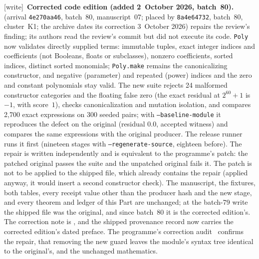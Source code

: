 \documentclass[11pt,letterpaper]{article}
\numberwithin{equation}{section}
\theoremstyle{definition}
\theoremstyle{remark}
\newcommand{\wtag}{\textup{[write]}}
\begin{document}
\wtag\ \textbf{Corrected code edition (added 2~October 2026, batch~80).}  (arrival \texttt{4e270aa46}, batch~80, manuscript~07; placed by \texttt{8a4e64732}, batch~80, cluster~K1; the archive dates its correction 3~October 2026) repairs the review's finding; its authors read the review's commit but did not execute its code. \texttt{Poly} now validates directly supplied terms: immutable tuples, exact integer indices and coefficients (not Booleans, floats or subclasses), nonzero coefficients, sorted indices, distinct sorted monomials; \texttt{Poly.make} remains the canonicalizing constructor, and negative (parameter) and repeated (power) indices and the zero and constant polynomials stay valid. The new suite  rejects 24 malformed constructor categories and the floating false zero (the exact residual at $2^{60}+1$ is $-1$, with score~$1$), checks canonicalization and mutation isolation, and compares 2{,}700 exact expressions on 300 seeded pairs; with \texttt{--baseline-module} it reproduces the defect on the original (residual $0.0$, accepted witness) and compares the same expressions with the original producer. The release runner runs it first (nineteen stages with \texttt{--regenerate-source}, eighteen before). The repair is written independently and is equivalent to the programme's patch: the patched original passes the suite and the unpatched original fails it. The patch is not to be applied to the shipped file, which already contains the repair (applied anyway, it would insert a second constructor check). The manuscript, the fixtures, both tables, every receipt value other than the producer hash and the new stage, and every theorem and ledger of this Part are unchanged; at the batch-79 write the shipped file was the original, and since batch~80 it is the corrected edition's. The correction note is , and the shipped provenance record  now carries the corrected edition's dated preface. The programme's correction audit~\cite{reviewbeighty} confirms the repair, that removing the new guard leaves the module's syntax tree identical to the original's, and the unchanged mathematics.
\end{document}
